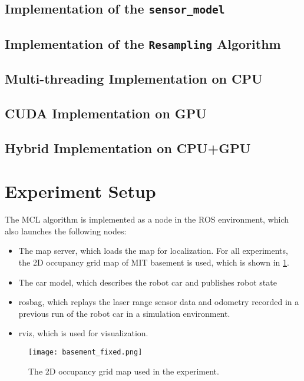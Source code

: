 \subsection{Implementation of the \texttt{sensor\_model}}

\subsection{Implementation of the \texttt{Resampling} Algorithm}

\subsection{Multi-threading Implementation on CPU}

\subsection{CUDA Implementation on GPU}

\subsection{Hybrid Implementation on CPU+GPU}


\section{Experiment Setup}
The MCL algorithm is implemented as a node in the ROS environment, which also
launches the following nodes:
\begin{itemize}
\item The map server, which loads the map for localization.
  For all experiments, the 2D occupancy grid map of MIT basement is used, which
  is shown in \Fig \ref{fig:omap}.
\item The car model, which describes the robot car and publishes robot state
\item rosbag, which replays the laser range sensor data and odometry recorded
  in a previous run of the robot car in a simulation environment.
\item rviz, which is used for visualization.
\end{itemize}

\begin{figure}[!h]
  \centering \texttt{[image: basement\_fixed.png]}
  \caption{The 2D occupancy grid map used in the experiment.}
  \label{fig:omap}
\end{figure}

